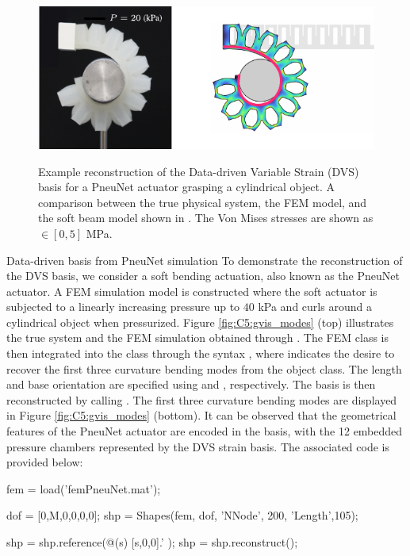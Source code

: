 \begin{figure}[!t]
\centering
\includegraphics*[width=.85\textwidth]{./pdf/thesis-figure-6-11-1.pdf} \\[0.15em]
% 
\caption{Example reconstruction of the Data-driven Variable Strain (DVS) basis for a PneuNet actuator grasping a cylindrical object. A comparison between the true physical system, the FEM model, and the soft beam model shown in . The Von Mises stresses are shown as \protect{}$\!\!\in [0,5]$ \si{\mega \pascal}.}
\vspace{-6mm}
\label{fig:C5:gvis_experiment}
\end{figure}
%
\begin{example}{Data-driven basis from PneuNet simulation}
To demonstrate the reconstruction of the DVS basis, we consider a soft bending actuation, also known as the PneuNet actuator. A FEM simulation model is constructed where the soft actuator is subjected to a linearly increasing pressure up to $40$ \si{\kilo \pascal} and curls around a cylindrical object when pressurized. Figure \ref{fig:C5:gvis_modes} (top) illustrates the true system and the FEM simulation obtained through . The FEM class is then integrated into the  class through the syntax , where  indicates the desire to recover the first three curvature bending modes from the  object class. The length and base orientation are specified using  and , respectively. The basis is then reconstructed by calling . The first three curvature bending modes are displayed in Figure \ref{fig:C5:gvis_modes} (bottom). It can be observed that the geometrical features of the PneuNet actuator are encoded in the basis, with the 12 embedded pressure chambers represented by the DVS strain basis. The associated code is provided below:
\end{example}
%
\begin{matlabcode}
fem = load('femPneuNet.mat');   %

dof = [0,M,0,0,0,0];  %
shp = Shapes(fem, dof, 'NNode', 200, 'Length',105);

shp = shp.reference(@(s) [s,0,0].' );
shp = shp.reconstruct();
\end{matlabcode} 
% 
\\

